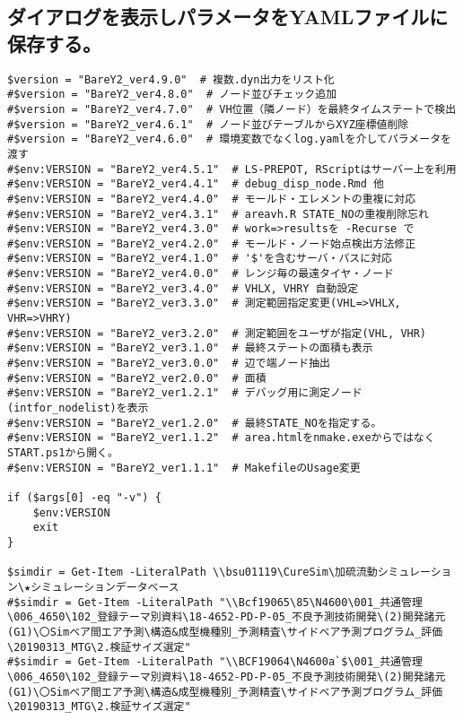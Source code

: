 \documentclass[dvipdfmx]{jsarticle}
\begin{document}
\subsection{ダイアログを表示しパラメータをYAMLファイルに保存する。}

\begin{verbatim}
$version = "BareY2_ver4.9.0"  # 複数.dyn出力をリスト化
#$version = "BareY2_ver4.8.0"  # ノード並びチェック追加
#$version = "BareY2_ver4.7.0"  # VH位置（隣ノード）を最終タイムステートで検出
#$version = "BareY2_ver4.6.1"  # ノード並びテーブルからXYZ座標値削除
#$version = "BareY2_ver4.6.0"  # 環境変数でなくlog.yamlを介してパラメータを渡す
#$env:VERSION = "BareY2_ver4.5.1"  # LS-PREPOT, RScriptはサーバー上を利用
#$env:VERSION = "BareY2_ver4.4.1"  # debug_disp_node.Rmd 他
#$env:VERSION = "BareY2_ver4.4.0"  # モールド・エレメントの重複に対応
#$env:VERSION = "BareY2_ver4.3.1"  # areavh.R STATE_NOの重複削除忘れ
#$env:VERSION = "BareY2_ver4.3.0"  # work=>resultsを -Recurse で
#$env:VERSION = "BareY2_ver4.2.0"  # モールド・ノード始点検出方法修正
#$env:VERSION = "BareY2_ver4.1.0"  # '$'を含むサーバ・パスに対応
#$env:VERSION = "BareY2_ver4.0.0"  # レンジ毎の最遠タイヤ・ノード
#$env:VERSION = "BareY2_ver3.4.0"  # VHLX, VHRY 自動設定
#$env:VERSION = "BareY2_ver3.3.0"  # 測定範囲指定変更(VHL=>VHLX, VHR=>VHRY)
#$env:VERSION = "BareY2_ver3.2.0"  # 測定範囲をユーザが指定(VHL, VHR)
#$env:VERSION = "BareY2_ver3.1.0"  # 最終ステートの面積も表示
#$env:VERSION = "BareY2_ver3.0.0"  # 辺で端ノード抽出
#$env:VERSION = "BareY2_ver2.0.0"  # 面積
#$env:VERSION = "BareY2_ver1.2.1"  # デバッグ用に測定ノード(intfor_nodelist)を表示
#$env:VERSION = "BareY2_ver1.2.0"  # 最終STATE_NOを指定する。
#$env:VERSION = "BareY2_ver1.1.2"  # area.htmlをnmake.exeからではなくSTART.ps1から開く。
#$env:VERSION = "BareY2_ver1.1.1"  # MakefileのUsage変更

if ($args[0] -eq "-v") {
    $env:VERSION
    exit
}

$simdir = Get-Item -LiteralPath \\bsu01119\CureSim\加硫流動シミュレーション\★シミュレーションデータベース
#$simdir = Get-Item -LiteralPath "\\Bcf19065\85\N4600\001_共通管理\006_4650\102_登録テーマ別資料\18-4652-PD-P-05_不良予測技術開発\(2)開発諸元(G1)\〇Simベア間エア予測\構造&成型機種別_予測精査\サイドベア予測プログラム_評価\20190313_MTG\2.検証サイズ選定"
#$simdir = Get-Item -LiteralPath "\\BCF19064\N4600a`$\001_共通管理\006_4650\102_登録テーマ別資料\18-4652-PD-P-05_不良予測技術開発\(2)開発諸元(G1)\〇Simベア間エア予測\構造&成型機種別_予測精査\サイドベア予測プログラム_評価\20190313_MTG\2.検証サイズ選定"


\end{verbatim}
\end{document}
